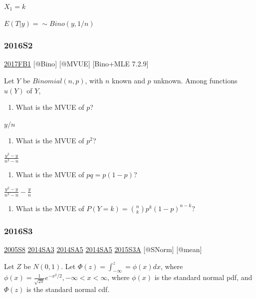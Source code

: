 \documentclass[6pt,twocolumn,Portrait]{article}
\providecommand{\tightlist}{%
  \setlength{\itemsep}{0pt}\setlength{\parskip}{0pt}}
\begin{document}
\(X_1=k\)

\(E(T|y)= \sim Bino(y,1/n)\)

\hypertarget{s2-4}{%
\subsubsection{2016S2}\label{s2-4}}

\protect\hyperlink{fb1-3}{2017FB1} {[}@Bino{]} {[}@MVUE{]} {[}Bino+MLE
7.2.9{]}

Let \(Y\) be \(Binomial(n,p)\), with \(n\) known and \(p\) unknown.
Among functions \(u(Y)\) of \(Y\),

\begin{enumerate}
\def\labelenumi{(\alph{enumi})}
\tightlist
\item
  What is the MVUE of \(p\)?
\end{enumerate}

\(y/n\)

\begin{enumerate}
\def\labelenumi{(\alph{enumi})}
\setcounter{enumi}{1}
\tightlist
\item
  What is the MVUE of \(p^2\)?
\end{enumerate}

\(\frac{y^2-y}{n^2-n}\)

\begin{enumerate}
\def\labelenumi{(\alph{enumi})}
\setcounter{enumi}{2}
\tightlist
\item
  What is the MVUE of \(pq=p(1-p)\)?
\end{enumerate}

\(\frac{y^2-y}{n^2-n}-\frac{y}n\)

\begin{enumerate}
\def\labelenumi{(\alph{enumi})}
\setcounter{enumi}{3}
\tightlist
\item
  { What is the MVUE of \(P(Y=k)=\binom{n}{k}p^k(1-p)^{n-k}\)?}
\end{enumerate}

\hypertarget{s3-4}{%
\subsubsection{2016S3}\label{s3-4}}

\protect\hyperlink{s8-1}{2005S8} \protect\hyperlink{sa3-2}{2014SA3}
\protect\hyperlink{sa5-1}{2014SA5} \protect\hyperlink{sa5-1}{2014SA5}
\protect\hyperlink{s3a-1}{2015S3A} {[}@SNorm{]} {[}@mean{]}

Let \(Z\) be \(N(0,1)\). Let \(\Phi(z)=\int_{-\infty}^z=\phi(x)dx\),
where \(\phi(x) = \frac1{\sqrt{2\pi}}e^{-x^2/2},-\infty<x<\infty\),
where \(\phi(x)\) is the standard normal pdf, and \(\Phi(z)\) is the
standard normal cdf.
\end{document}
